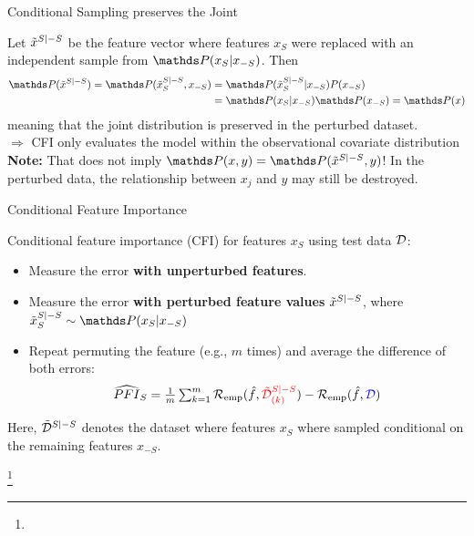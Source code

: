 \documentclass[11pt,compress,t,notes=noshow, aspectratio=169, xcolor=table]{beamer}
\begin{document}
 
 \begin{vbframe}{Conditional Sampling preserves the Joint}
 
 Let $\pert{x}{S}{-S}$ be the feature vector where features $x_S$ were replaced with an independent sample from $\P(x_S|x_{-S})$. Then
%
\begin{align*}
  \P(\pert{x}{S}{-S}) = \P(\pert{x}{S}{-S}_S, x_{-S}) &= \P(\pert{x}{S}{-S}_S|x_{-S}) P(x_{-S})\\
   &= \P(x_S|x_{-S}) \P(x_{-S}) = \P(x)
\end{align*}
 meaning that the joint distribution is preserved in the perturbed dataset.\\
 $\Rightarrow$ CFI only evaluates the model within the observational covariate distribution\\
 \lz
 \textbf{Note:} That does not imply $\P(x,y) = \P(\pert{x}{S}{-S}, y)$! In the perturbed data, the relationship between $x_j$ and $y$ may still be destroyed.\\
 \end{vbframe}



\begin{vbframe}{Conditional Feature Importance}
\normalsize

Conditional feature importance (CFI) for features $x_S$ using test data $\D$:
\begin{itemize}
  \item Measure the error \color{blue}\textbf{with unperturbed features}\color{black}.
  \item Measure the error \color{red}\textbf{with perturbed feature values} \color{black} $\pert{x}{S}{-S}$, where $\pert{x}{S}{-S}_S \sim \P(x_S|x_{-S})$
  \item Repeat permuting the feature (e.g., $m$ times) and average the difference of both errors: 
$$\widehat{PFI}_S = \tfrac{1}{m} \textstyle\sum\nolimits_{k = 1}^{m} \riske (\fh, {\color{red}\pert{\D}{S}{-S}_{(k)}}) - \riske (\fh, {\color{blue}\D})$$
\end{itemize}

Here, $\pert{\D}{S}{-S}$ denotes the dataset where features $x_S$ where sampled conditional on the remaining features $x_{-S}$.

\footnote[frame]{}

\end{vbframe}
\end{document}
